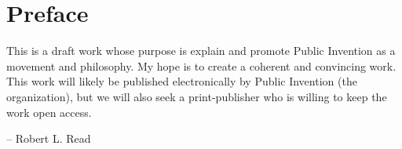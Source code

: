 \documentclass[
	fontsize=10pt, %
	twoside=false, %
	secnumdepth=1, %
]{kaobook}
\begin{document}

\maketitle


\chapter*{Preface}

This is a draft work whose purpose is explain and promote Public Invention as a
movement and philosophy. My hope is to create a coherent and convincing work.
This work will likely be published electronically by Public Invention (the organization),
but we will also seek a print-publisher who is willing to keep the work open access.

-- Robert L. Read


\begingroup %

\setlength{\textheight}{230\vscale} %

\etocstandarddisplaystyle %
\etocstandardlines %

\tableofcontents %

\listoffigures %
\end{document}
